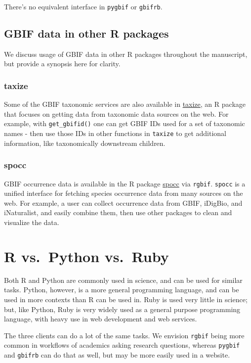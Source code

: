 \documentclass[author-year, review, 11pt]{components/elsarticle} %
\begin{document}
There's no equivalent interface in \texttt{pygbif} or \texttt{gbifrb}.

\subsection{GBIF data in other R
packages}\label{gbif-data-in-other-r-packages}

We discuss usage of GBIF data in other R packages throughout the
manuscript, but provide a synopsis here for clarity.

\subsubsection{taxize}\label{taxize}

Some of the GBIF taxonomic services are also available in
\href{https://github.com/ropensci/taxize}{taxize}, an R package that
focuses on getting data from taxonomic data sources on the web. For
example, with \texttt{get\_gbifid()} one can get GBIF IDs used for a set
of taxonomic names - then use those IDs in other functions in
\texttt{taxize} to get additional information, like taxonomically
downstream children.

\subsubsection{spocc}\label{spocc}

GBIF occurrence data is available in the R package
\href{https://github.com/ropensci/spocc}{spocc} via \texttt{rgbif}.
\texttt{spocc} is a unified interface for fetching species occurrence
data from many sources on the web. For example, a user can collect
occurrence data from GBIF, iDigBio, and iNaturalist, and easily combine
them, then use other packages to clean and visualize the data.

\section{R vs.~Python vs.~Ruby}\label{r-vs.python-vs.ruby}

Both R and Python are commonly used in science, and can be used for
similar tasks. Python, however, is a more general programming language,
and can be used in more contexts than R can be used in. Ruby is used
very little in science; but, like Python, Ruby is very widely used as a
general purpose programming language, with heavy use in web development
and web services.

The three clients can do a lot of the same tasks. We envision
\texttt{rgbif} being more common in workflows of academics asking
research questions, whereas \texttt{pygbif} and \texttt{gbifrb} can do
that as well, but may be more easily used in a website.
\end{document}
